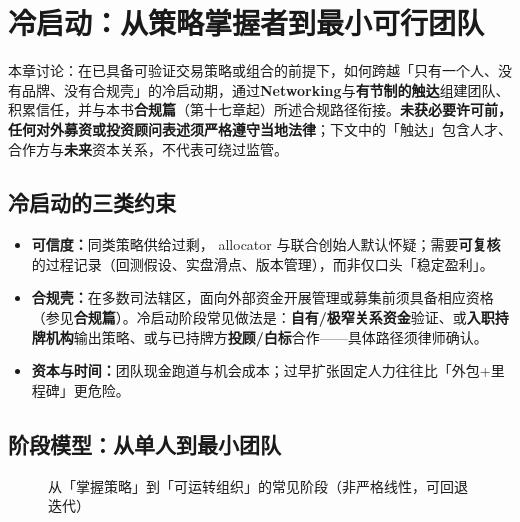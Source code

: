 \chapter{冷启动：从策略掌握者到最小可行团队}

本章讨论：在已具备可验证交易策略或组合的前提下，如何跨越「只有一个人、没有品牌、没有合规壳」的冷启动期，通过\textbf{Networking}与\textbf{有节制的触达}组建团队、积累信任，并与本书\textbf{合规篇}（第十七章起）所述合规路径衔接。\textbf{未获必要许可前，任何对外募资或投资顾问表述须严格遵守当地法律}；下文中的「触达」包含人才、合作方与\textbf{未来}资本关系，不代表可绕过监管。

\section{冷启动的三类约束}

\begin{itemize}
  \item \textbf{可信度：}同类策略供给过剩， allocator 与联合创始人默认怀疑；需要\textbf{可复核}的过程记录（回测假设、实盘滑点、版本管理），而非仅口头「稳定盈利」。
  \item \textbf{合规壳：}在多数司法辖区，面向外部资金开展管理或募集前须具备相应资格（参见\textbf{合规篇}）。冷启动阶段常见做法是：\textbf{自有/极窄关系资金}验证、或\textbf{入职持牌机构}输出策略、或与已持牌方\textbf{投顾/白标}合作——具体路径须律师确认。
  \item \textbf{资本与时间：}团队现金跑道与机会成本；过早扩张固定人力往往比「外包+里程碑」更危险。
\end{itemize}

\section{阶段模型：从单人到最小团队}

\begin{figure}[htbp]
\centering
{}
\caption{从「掌握策略」到「可运转组织」的常见阶段（非严格线性，可回退迭代）}
\label{fig:coldstart-stages}
\end{figure}

